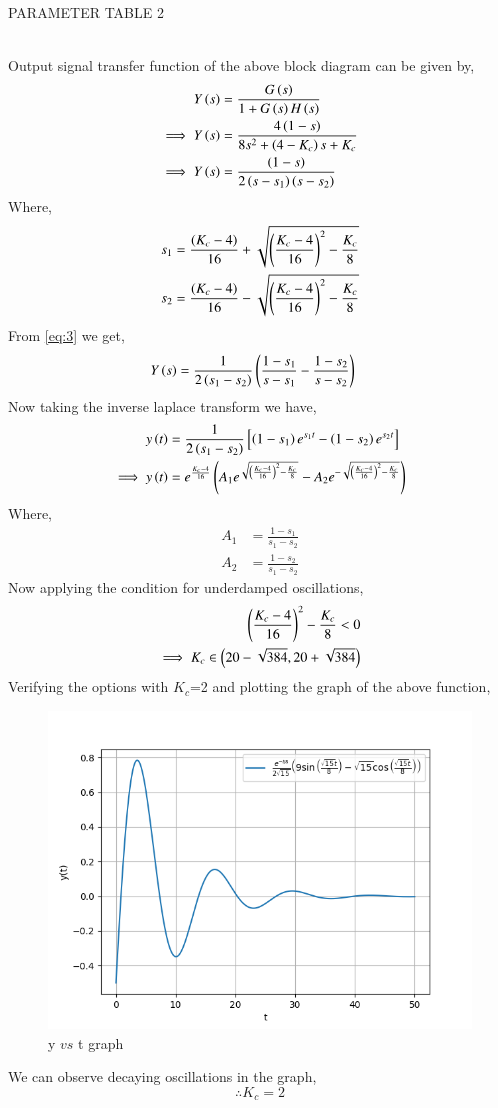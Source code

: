 \documentclass[journal,12pt,twocolumn]{IEEEtran}
\theoremstyle{remark}
\begin{document}
\begin{table}[ht]
    \centering
    
    \caption{PARAMETER TABLE 2}
    \label{tab:ch.45.2}
\end{table} \\
Output signal transfer function of the above block diagram can be given by,
\begin{align}
     Y\left(s\right) &= \frac{G\left(s\right)}{1+G\left(s\right)H\left(s\right)}    \\
    \implies Y\left(s\right) &= \frac{4\left(1-s\right)}{8s^2 + \left(4-K_c\right)s + K_c}    \\
    \implies Y\left(s\right) &= \frac{\left(1-s\right)}{2\left(s-s_1\right)\left(s-s_2\right)}  \label{eq:3}
\end{align}
Where,
\begin{align}
    s_1 &= \frac{\left(K_c-4\right)}{16} + \sqrt{\left(\frac{K_c-4}{16}\right)^2 - \frac{K_c}{8}}  \\
    s_2 &= \frac{\left(K_c-4\right)}{16} - \sqrt{\left(\frac{K_c-4}{16}\right)^2 - \frac{K_c}{8}} 
\end{align}
From \eqref{eq:3} we get,
\begin{align}
    Y\left(s\right) &= \frac{1}{2\left(s_1-s_2\right)}\left(\frac{1-s_1}{s-s_1}-\frac{1-s_2}{s-s_2}\right)
\end{align}
Now taking the inverse laplace transform we have,
\begin{align}
    y\left(t\right) &= \frac{1}{2\left(s_1-s_2\right)} \left [\left(1-s_1\right)e^{s_1t}-\left(1-s_2\right)e^{s_2t} \right ]  \\
    \implies y\left(t\right) &= e^{\frac{K_c-4}{16}}\left(A_1e^{\sqrt{\left(\frac{K_c-4}{16}\right)^2 - \frac{K_c}{8}}} - A_2e^{-\sqrt{\left(\frac{K_c-4}{16}\right)^2 - \frac{K_c}{8}}}\right)    
\end{align}
Where,
\begin{align}
    A_1 &= \frac{1-s_1}{s_1-s_2}    \\
    A_2 &= \frac{1-s_2}{s_1-s_2}    
\end{align}
Now applying the condition for underdamped oscillations,
\begin{align}
    \left(\frac{K_c-4}{16}\right)^2 - \frac{K_c}{8} < 0    \\
    \implies K_c \in \left(20-\sqrt{384} , 20+\sqrt{384}\right) 
\end{align}
Verifying the options with $K_c$=2 and plotting the graph of the above function,   \\
\begin{figure}[ht]
    \centering
    \includegraphics[width=\columnwidth]{figs/b.png}
    \caption{y $vs$ t graph}
    \label{fig:ch.45.2}
\end{figure}    
We can observe decaying oscillations in the graph,    
$$\therefore K_c=2$$
\end{document}
